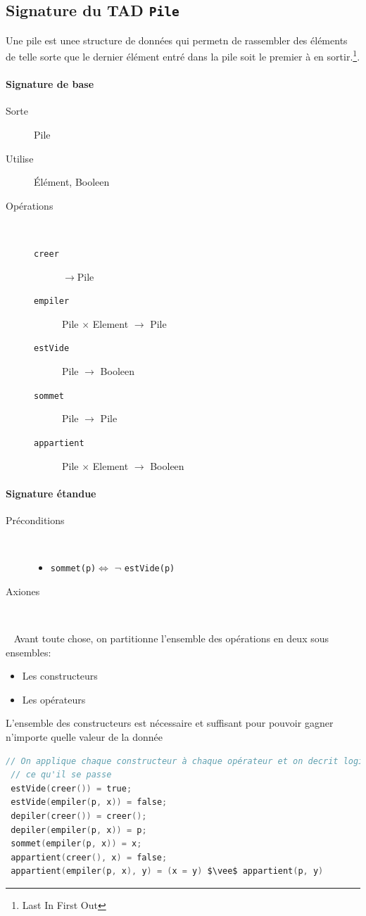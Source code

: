 \subsection{Signature du TAD \texttt{Pile}}
Une pile est unee structure de données qui permetn de rassembler des éléments de telle sorte que le dernier élément entré dans la pile soit le premier à
en sortir.\footnote{Last In First Out}.
\paragraph{Signature de base}
\begin{description}
	\item[Sorte] Pile
	\item[Utilise] Élément, Booleen 
	\item[Opérations]~ 
		\begin{description}
			\item[\texttt{creer}] $\rightarrow$Pile %
			\item[\texttt{empiler}] Pile $\times$ Element $\rightarrow$ Pile
			\item[\texttt{estVide}] Pile $\rightarrow$ Booleen  %
			\item[\texttt{sommet}] Pile $\rightarrow$ Pile
			\item[\texttt{appartient}] Pile $\times$ Element $\rightarrow$ Booleen 
		\end{description}
\end{description}

\paragraph{Signature étandue}
\begin{description}
	\item[Préconditions]~
		\begin{itemize}
			\item \texttt{sommet(p)}$\Leftrightarrow$ $\neg$ \texttt{estVide(p)}
		\end{itemize}
	\item[Axiones]~
\end{description}
~\newline
Avant toute chose, on partitionne l'ensemble des opérations en deux sous ensembles: 
\begin{itemize}
	\item Les constructeurs
	\item Les opérateurs
\end{itemize}
L'ensemble des constructeurs est nécessaire et suffisant pour pouvoir gagner n'importe quelle valeur de la donnée
\begin{lstlisting}[language=C, numbers=none,caption=Opérations du TAD Pile]
 // On applique chaque constructeur à chaque opérateur et on decrit logiquement 
 // ce qu'il se passe
 estVide(creer()) = true;
 estVide(empiler(p, x)) = false;
 depiler(creer()) = creer();
 depiler(empiler(p, x)) = p;
 sommet(empiler(p, x)) = x;
 appartient(creer(), x) = false;
 appartient(empiler(p, x), y) = (x = y) $\vee$ appartient(p, y)
 \end{lstlisting}


